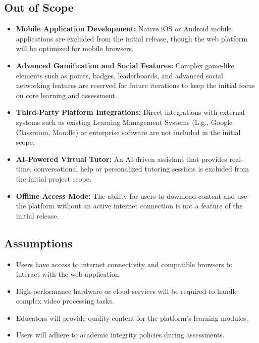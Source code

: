 \subsection{Out of Scope}
\label{subsec:out_of_scope}
\begin{itemize}
    \item \textbf{Mobile Application Development:} Native iOS or Android mobile applications are excluded from the initial release, though the web platform will be optimized for mobile browsers.
    \item \textbf{Advanced Gamification and Social Features:} Complex game-like elements such as points, badges, leaderboards, and advanced social networking features are reserved for future iterations to keep the initial focus on core learning and assessment.
    \item \textbf{Third-Party Platform Integrations:} Direct integrations with external systems such as existing Learning Management Systems (L.g., Google Classroom, Moodle) or enterprise software are not included in the initial scope.
    \item \textbf{AI-Powered Virtual Tutor:} An AI-driven assistant that provides real-time, conversational help or personalized tutoring sessions is excluded from the initial project scope.
    \item \textbf{Offline Access Mode:} The ability for users to download content and use the platform without an active internet connection is not a feature of the initial release.
\end{itemize}

\subsection{Assumptions}
\label{subsec:assumptions}
\begin{itemize}
    \item Users have access to internet connectivity and compatible browsers to interact with the web application.
    \item High-performance hardware or cloud services will be required to handle complex video processing tasks.
    \item Educators will provide quality content for the platform's learning modules.
    \item Users will adhere to academic integrity policies during assessments.
\end{itemize}

